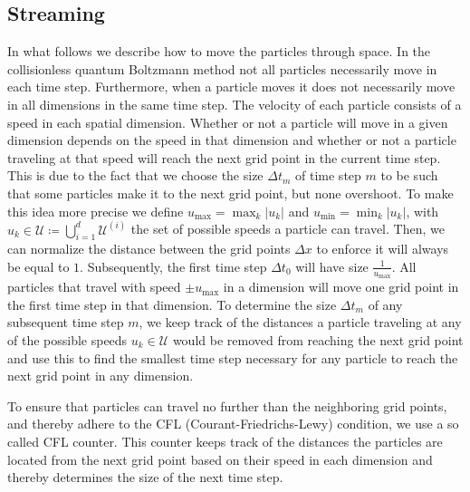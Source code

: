 \subsection{Streaming}
In what follows we describe how to move the particles through space.
In the collisionless quantum Boltzmann method not all particles necessarily move in each time step. 
Furthermore, when a particle moves it does not necessarily move in all dimensions in the same time step. The velocity of each particle consists of a speed in each spatial dimension. Whether or not a particle will move in a given dimension depends on the speed in that dimension and whether or not a particle traveling at that speed will reach the next grid point in the current time step. 
This is due to the fact that we choose the size $\Delta t_m$ of time step $m$ to be such that some particles make it to the next grid point, but none overshoot. 
To make this idea more precise we define $u_\text{max} = \max_k |u_k|$ and $u_\text{min} = \min_k |u_k|$, with $u_k \in \mathcal{U} \coloneqq \bigcup_{i=1}^d \mathcal{U}^{(i)}$ the set of possible speeds a particle can travel. Then, we can normalize the distance between the grid points $\Delta x$ to enforce it will always be equal to $1$. Subsequently, the first time step $\Delta t_0$ will have size $\frac{1}{u_\text{max}}$. All particles that travel with speed $\pm u_{\text{max}}$ in a dimension will move one grid point in the first time step in that dimension. To determine the size $\Delta t_m$ of any subsequent time step $m$, we keep track of the distances a particle traveling at any of the possible speeds $u_k\in\mathcal{U}$ would be removed from reaching the next grid point and use this to find the smallest time step necessary for any particle to reach the next grid point in any dimension.

To ensure that particles can travel no further than the neighboring grid points, and thereby adhere to the CFL (Courant-Friedrichs-Lewy) condition, we use a so called CFL counter. This counter keeps track of the distances the particles are located from the next grid point based on their speed in each dimension and thereby determines the size of the next time step. 


